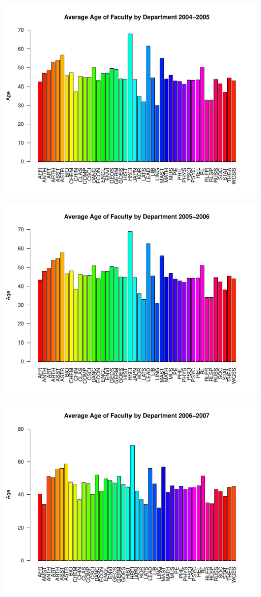\documentclass[12pt,a4paper]{article}\usepackage[]{graphicx}\usepackage[]{color}
\makeatletter
\def\maxwidth{ %
  \ifdim\Gin@nat@width>\linewidth
    \linewidth
  \else
    \Gin@nat@width
  \fi
}
\newenvironment{knitrout}{}{} %
\theoremstyle{definition}
\makeatother
\begin{document}
\begin{knitrout}
\color{fgcolor}
\includegraphics[width=\maxwidth]{figure/unnamed-chunk-10-1} 

\includegraphics[width=\maxwidth]{figure/unnamed-chunk-10-2} 

\includegraphics[width=\maxwidth]{figure/unnamed-chunk-10-3} 


\end{knitrout}
\end{document}
